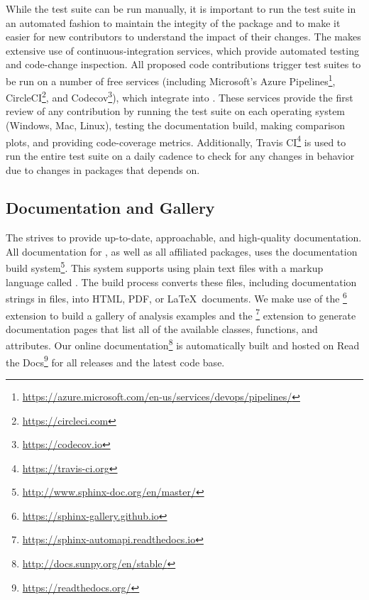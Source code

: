 While the test suite can be run manually, it is important to run the test suite in an automated fashion to maintain the integity of the package and to make it easier for new contributors to understand the impact of their changes.
The \sunpyproj makes extensive use of continuous-integration services, which provide automated testing and code-change inspection.
All proposed code contributions trigger test suites to be run on a number of free services (including
Microsoft's Azure Pipelines\footnote{\url{https://azure.microsoft.com/en-us/services/devops/pipelines/}}, CircleCI\footnote{\url{https://circleci.com}}, and Codecov\footnote{\url{https://codecov.io}}), which integrate into \github.
These services provide the first review of any contribution by running the test suite on each operating system (Windows, Mac, Linux), testing the documentation build, making comparison plots, and providing code-coverage metrics.
Additionally, Travis CI\footnote{\url{https://travis-ci.org}} is used to run the entire test suite on a daily cadence to check for any changes in behavior due to changes in packages that \sunpypkg depends on.

\subsection{Documentation and Gallery}
\label{sec:docs}

The \sunpyproj strives to provide up-to-date, approachable, and high-quality documentation.
All documentation for \sunpypkg, as well as all affiliated packages, uses the  documentation build system\footnote{\url{http://www.sphinx-doc.org/en/master/}}.
This system supports using plain text files with a markup language called .
The build process converts these files, including documentation strings in \python files, into HTML, PDF, or \LaTeX\ documents.
We make use of the \footnote{\url{https://sphinx-gallery.github.io}} extension to build a gallery of analysis examples and the \footnote{\url{https://sphinx-automapi.readthedocs.io}} extension to generate documentation pages that list all of the available classes, functions, and attributes.
Our online documentation\footnote{\url{http://docs.sunpy.org/en/stable/}} is automatically built and hosted on Read the Docs\footnote{\url{https://readthedocs.org/}} for all releases and the latest code base.
